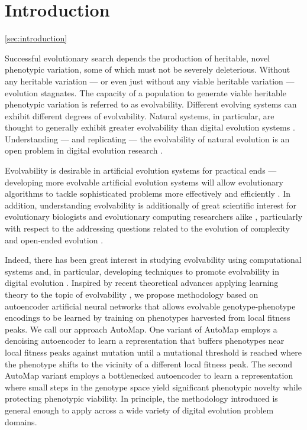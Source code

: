 \section{Introduction} \ref{sec:introduction}

Successful evolutionary search depends the production of heritable, novel phenotypic variation, some of which must not be severely deleterious.
Without any heritable variation --- or even just without any viable heritable variation --- evolution stagnates.
The capacity of a population to generate viable heritable phenotypic variation is referred to as evolvability.
Different evolving systems can exhibit different degrees of evolvability.
Natural systems, in particular, are thought to generally exhibit greater evolvability than digital evolution systems \cite{wagner1996perspective}.
Understanding --- and replicating --- the evolvability of natural evolution is an open problem in digital evolution research \cite{mengistu2016evolvability}.

Evolvability is desirable in artificial evolution systems for practical ends --- developing more evolvable artificial evolution systems will allow evolutionary algorithms to tackle sophisticated problems more effectively and efficiently \cite{bentley1999three, reisinger2007acquiring}.
In addition, understanding evolvability is additionally of great scientific interest for evolutionary biologists and evolutionary computing researchers alike \cite{mengistu2016evolvability, pigliucci2008evolvability}, particularly with respect to the addressing questions related to the evolution of complexity and open-ended evolution \cite{kirschner1998evolvability, hu2010evolvability}.

Indeed, there has been great interest in studying evolvability using computational systems and, in particular, developing techniques to promote evolvability in digital evolution \cite{kashtan2005spontaneous, mengistu2016evolvability, reisinger2005towards, cheney2013unshackling, nguyen2015innovation, lehman2013evolvability}.
Inspired by recent theoretical advances applying learning theory to the topic of evolvability \cite{kouvaris2017evolution, watson2016can}, we propose methodology based on autoencoder artificial neural networks that allows evolvable genotype-phenotype encodings to be learned by training on phenotypes harvested from local fitness peaks.
We call our approach AutoMap.
One variant of AutoMap employs a denoising autoencoder to learn a representation that buffers phenotypes near local fitness peaks against mutation until a mutational threshold is reached where the phenotype shifts to the vicinity of a different local fitness peak.
The second AutoMap variant employs a bottlenecked autoencoder to learn a representation where small steps in the genotype space yield significant phenotypic novelty while protecting phenotypic viability.
In principle, the methodology introduced is general enough to apply across a wide variety of digital evolution problem domains.
